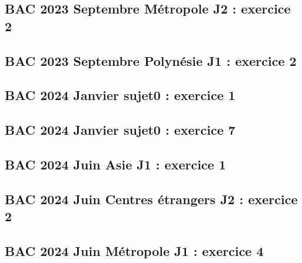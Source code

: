 \documentclass[lang=fr,edition=teacher,layout=sheet]{mxbook}
\begin{document}
\begingroup\endgroup
\par\bigskip
{}\subsection*{BAC 2023 Septembre Métropole J2 : exercice 2}
\begingroup\endgroup
\par\bigskip
{}\subsection*{BAC 2023 Septembre Polynésie J1 : exercice 2}
\begingroup\endgroup
\par\bigskip
{}\subsection*{BAC 2024 Janvier sujet0 : exercice 1}
\begingroup\endgroup
\par\bigskip
{}\subsection*{BAC 2024 Janvier sujet0 : exercice 7}
\begingroup\endgroup
\par\bigskip
{}\subsection*{BAC 2024 Juin Asie J1 : exercice 1}
\begingroup\endgroup
\par\bigskip
{}\subsection*{BAC 2024 Juin Centres étrangers J2 : exercice 2}
\begingroup\endgroup
\par\bigskip
{}\subsection*{BAC 2024 Juin Métropole J1 : exercice 4}
\end{document}

